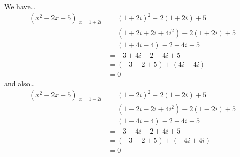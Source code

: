 \documentclass[11pt,letterpaper]{article}
\begin{document}
\sol We have\dots
	\[
	\begin{aligned}
	(x^2 - 2x + 5) \bigg|_{x= 1 + 2i}&= (1 + 2i)^2 - 2(1 + 2i) + 5 \\
	&= (1 + 2i + 2i + 4i^2) - 2(1 + 2i) + 5 \\
	&= (1 + 4i - 4) - 2 - 4i + 5 \\
	&= -3 + 4i - 2 - 4i + 5 \\
	&= (-3 - 2 + 5) + (4i - 4i) \\
	&= 0 
	\end{aligned}
	\] 
and also\dots
	\[
	\begin{aligned}
	(x^2 - 2x + 5) \bigg|_{x= 1 - 2i}&= (1 - 2i)^2 - 2(1 - 2i) + 5 \\
	&= (1 - 2i - 2i + 4i^2) - 2(1 - 2i) + 5 \\
	&= (1 - 4i - 4) - 2 + 4i + 5 \\
	&= -3 - 4i - 2 + 4i + 5 \\
	&= (-3 - 2 + 5) + (-4i + 4i) \\
	&= 0 
	\end{aligned}
	\] 
\end{document}
